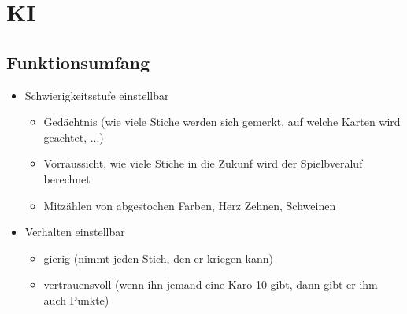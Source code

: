 \documentclass[12pt,a4paper]{article}
\begin{document}
\section{KI}
\subsection{Funktionsumfang}
\begin{itemize}
\item Schwierigkeitsstufe einstellbar
\begin{itemize}
\item Gedächtnis (wie viele Stiche werden sich gemerkt, auf welche Karten wird geachtet, ...)
\item Vorraussicht, wie viele Stiche in die Zukunf wird der Spielbveraluf berechnet
\item Mitzählen von abgestochen Farben, Herz Zehnen, Schweinen
\end{itemize}
\item Verhalten einstellbar
\begin{itemize}
\item gierig (nimmt jeden Stich, den er kriegen kann)
\item vertrauensvoll (wenn ihn jemand eine Karo 10 gibt, dann gibt er ihm auch Punkte)
\end{itemize}
\end{itemize}
\end{document}
